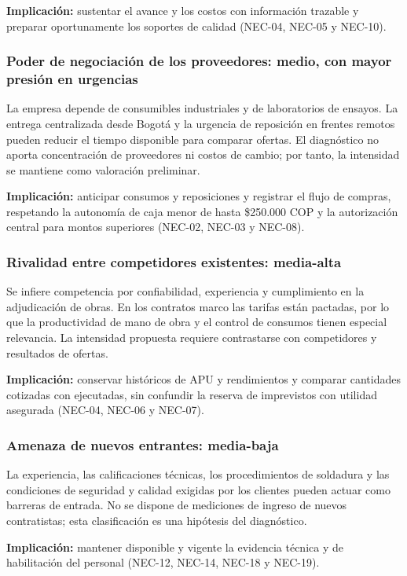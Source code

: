 \documentclass[12pt,letterpaper]{article}
\begin{document}
\textbf{Implicación:} sustentar el avance y los costos con información trazable y preparar oportunamente los soportes de calidad (NEC-04, NEC-05 y NEC-10).

\subsubsection{Poder de negociación de los proveedores: medio, con mayor presión en urgencias}
La empresa depende de consumibles industriales y de laboratorios de ensayos. La entrega centralizada desde Bogotá y la urgencia de reposición en frentes remotos pueden reducir el tiempo disponible para comparar ofertas. El diagnóstico no aporta concentración de proveedores ni costos de cambio; por tanto, la intensidad se mantiene como valoración preliminar.

\textbf{Implicación:} anticipar consumos y reposiciones y registrar el flujo de compras, respetando la autonomía de caja menor de hasta \$250.000 COP y la autorización central para montos superiores (NEC-02, NEC-03 y NEC-08).

\subsubsection{Rivalidad entre competidores existentes: media-alta}
Se infiere competencia por confiabilidad, experiencia y cumplimiento en la adjudicación de obras. En los contratos marco las tarifas están pactadas, por lo que la productividad de mano de obra y el control de consumos tienen especial relevancia. La intensidad propuesta requiere contrastarse con competidores y resultados de ofertas.

\textbf{Implicación:} conservar históricos de APU y rendimientos y comparar cantidades cotizadas con ejecutadas, sin confundir la reserva de imprevistos con utilidad asegurada (NEC-04, NEC-06 y NEC-07).

\subsubsection{Amenaza de nuevos entrantes: media-baja}
La experiencia, las calificaciones técnicas, los procedimientos de soldadura y las condiciones de seguridad y calidad exigidas por los clientes pueden actuar como barreras de entrada. No se dispone de mediciones de ingreso de nuevos contratistas; esta clasificación es una hipótesis del diagnóstico.

\textbf{Implicación:} mantener disponible y vigente la evidencia técnica y de habilitación del personal (NEC-12, NEC-14, NEC-18 y NEC-19).
\end{document}
